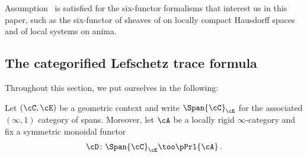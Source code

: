 

Assumption~ is satisfied for the six-functor formalisms that interest us in this paper, such as the six-functor of sheaves of on locally compact Hausdorff spaces and of local systems on anima.


\subsection{The categorified Lefschetz trace formula}

Throughout this section, we put ourselves in the following:

\begin{set}
Let $(\cC,\cE)$ be a geometric context and write $\Span{\cC}_{\cE}$ for the
associated $(\infty,1)$ category of spans. Moreover, let $\cA$ be a locally
rigid $\infty$-category and fix a symmetric monoidal
functor
\[ \cD\colon \Span{\cC}_{\cE}\too \pPrl{\cA}\,.\]
\end{set}

